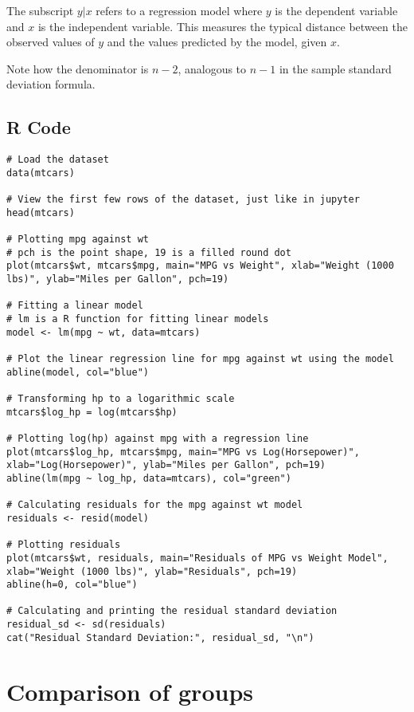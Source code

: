 \documentclass{article}
\begin{document}
The subscript $y|x$ refers to a regression model where $y$ is the dependent variable and $x$ is the independent variable. This measures the typical distance between the observed values of $y$ and the values predicted by the model, given $x$.

Note how the denominator is $n-2$, analogous to $n-1$ in the sample standard deviation formula.

\pagebreak

\subsection{R Code}

\begin{lstlisting}
# Load the dataset
data(mtcars)

# View the first few rows of the dataset, just like in jupyter
head(mtcars)

# Plotting mpg against wt
# pch is the point shape, 19 is a filled round dot
plot(mtcars$wt, mtcars$mpg, main="MPG vs Weight", xlab="Weight (1000 lbs)", ylab="Miles per Gallon", pch=19)

# Fitting a linear model
# lm is a R function for fitting linear models
model <- lm(mpg ~ wt, data=mtcars)

# Plot the linear regression line for mpg against wt using the model
abline(model, col="blue")

# Transforming hp to a logarithmic scale
mtcars$log_hp = log(mtcars$hp)

# Plotting log(hp) against mpg with a regression line
plot(mtcars$log_hp, mtcars$mpg, main="MPG vs Log(Horsepower)", xlab="Log(Horsepower)", ylab="Miles per Gallon", pch=19)
abline(lm(mpg ~ log_hp, data=mtcars), col="green")

# Calculating residuals for the mpg against wt model
residuals <- resid(model)

# Plotting residuals
plot(mtcars$wt, residuals, main="Residuals of MPG vs Weight Model", xlab="Weight (1000 lbs)", ylab="Residuals", pch=19)
abline(h=0, col="blue")

# Calculating and printing the residual standard deviation
residual_sd <- sd(residuals)
cat("Residual Standard Deviation:", residual_sd, "\n")
\end{lstlisting}

\pagebreak

\section{Comparison of groups}
\end{document}
